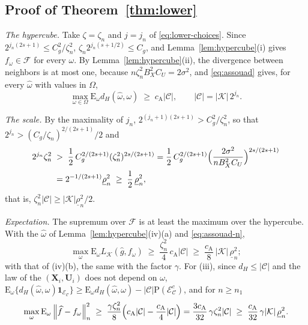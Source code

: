 \documentclass[10pt]{book}
\theoremstyle{definition}
\newcommand{\E}{\mathrm{E}}
\newcommand{\Prob}{\mathrm{P}}
\newcommand{\normn}[1]{\left\lVert #1 \right\rVert_{n}}
\newcommand{\lev}{j}
\newcommand{\bX}{\mathbf{X}}
\newcommand{\bU}{\mathbf{U}}
\newcommand{\Kcal}{\mathcal{K}}
\newcommand{\rlow}{\underline{\rho}_{n}}
\newcommand{\cA}{c_{\mathrm{A}}}
\begin{document}
{\subsection*{Proof of Theorem~\ref{thm:lower}}

\emph{The hypercube.} Take $\zeta = \zeta_n$ and $\lev = \lev_n$ of
\eqref{eq:lower-choices}. Since $2^{\lev_n(2s+1)} \le C_g^{2}/\zeta_n^{2}$,
$\zeta_n2^{\lev_n(s+1/2)} \le C_g$, and Lemma~\ref{lem:hypercube}(i) gives
$f_{\omega} \in \mathcal{F}$ for every $\omega$. By
Lemma~\ref{lem:hypercube}(ii), the divergence between neighbors is at most one,
because $n\zeta_n^{2}B_X^{2}C_U = 2\sigma^{2}$, and
\eqref{eq:assouad} gives, for every $\widehat\omega$ with values in $\Omega$,
\begin{equation}
  \label{eq:assouad-n}
  \max_{\omega\in\Omega}\E_{\omega}d_{H}(\widehat\omega,\omega)
  \;\ge\; \cA|\mathcal{C}|,
  \qquad |\mathcal{C}| = |\Kcal|\,2^{\lev_n} .
\end{equation}

\emph{The scale.} By the maximality of $\lev_n$,
$2^{(\lev_n+1)(2s+1)} > C_g^{2}/\zeta_n^{2}$, so that
$2^{\lev_n} > (C_g/\zeta_n)^{2/(2s+1)}/2$ and
\begin{align*}
  2^{\lev_n}\zeta_n^{2} \;&>\; \frac12\,C_g^{2/(2s+1)}(\zeta_n^{2})^{2s/(2s+1)}
  = \frac12\,C_g^{2/(2s+1)}\Bigl(\frac{2\sigma^{2}}{nB_X^{2}C_U}\Bigr)^{2s/(2s+1)}
  \\
  &= 2^{-1/(2s+1)}\rlow^{2} \;\ge\; \frac12\,\rlow^{2},
\end{align*}
that is, $\zeta_n^{2}|\mathcal{C}| \ge |\Kcal|\rlow^{2}/2$.

\emph{Expectation.} The supremum over $\mathcal{F}$ is at least the maximum
over the hypercube. With the $\widehat\omega$ of
Lemma~\ref{lem:hypercube}(iv)(a) and \eqref{eq:assouad-n},
\[
  \max_{\omega}\E_{\omega}L_{\Kcal}(\widehat{g},f_{\omega}) \;\ge\;
  \frac{\zeta_n^{2}}{4}\,\cA|\mathcal{C}| \;\ge\; \frac{\cA}{8}\,|\Kcal|\,\rlow^{2} ;
\]
with that of (iv)(b), the same with the factor $\gamma$. For (iii), since
$d_{H} \le |\mathcal{C}|$ and the law of the $(\bX_i,\bU_i)$ does not depend
on $\omega$, $\E_{\omega}\{d_{H}(\widehat\omega,\omega)\mathbf{1}_{\mathcal{E}_{\mathcal{C}}}\}
\ge \E_{\omega}d_{H}(\widehat\omega,\omega) -
|\mathcal{C}|\Prob(\mathcal{E}_{\mathcal{C}}^{c})$, and for $n \ge n_{1}$
\[
  \max_{\omega}\E_{\omega}\normn{\widehat{f}-f_{\omega}}^{2}
  \;\ge\; \frac{\gamma\zeta_n^{2}}{8}\Bigl(\cA|\mathcal{C}| -
  \frac{\cA}{4}|\mathcal{C}|\Bigr)
  = \frac{3\cA}{32}\,\gamma\zeta_n^{2}|\mathcal{C}|
  \;\ge\; \frac{\cA}{32}\,\gamma|\Kcal|\,\rlow^{2} .
\]

}
\end{document}

